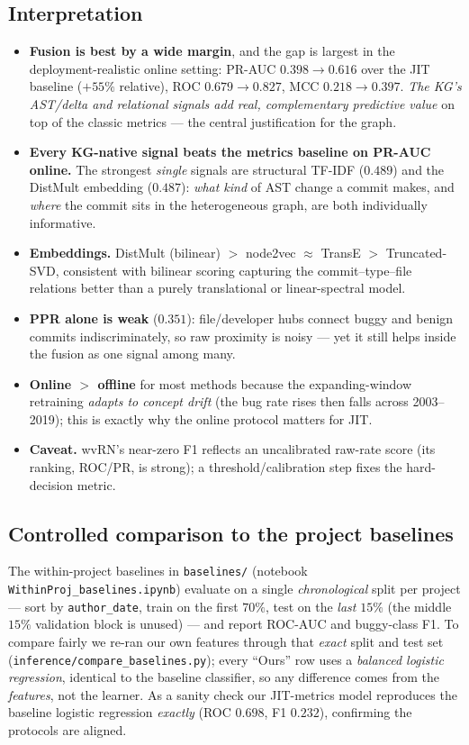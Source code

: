 \documentclass[11pt,a4paper]{article}
\newcommand{\code}[1]{\texttt{#1}}
\begin{document}
	\subsection{Interpretation}
	\begin{itemize}[nosep]
		\item \textbf{Fusion is best by a wide margin}, and the gap is largest in the
		deployment-realistic online setting: PR-AUC $0.398\!\rightarrow\!0.616$
		over the JIT baseline ($+55\%$ relative), ROC $0.679\!\rightarrow\!0.827$,
		MCC $0.218\!\rightarrow\!0.397$. \emph{The KG's AST/delta and relational
			signals add real, complementary predictive value} on top of the classic
		metrics --- the central justification for the graph.
		\item \textbf{Every KG-native signal beats the metrics baseline on PR-AUC
			online.} The strongest \emph{single} signals are structural TF-IDF
		($0.489$) and the DistMult embedding ($0.487$): \emph{what kind} of AST
		change a commit makes, and \emph{where} the commit sits in the
		heterogeneous graph, are both individually informative.
		\item \textbf{Embeddings.} DistMult (bilinear) $>$ node2vec $\approx$ TransE
		$>$ Truncated-SVD, consistent with bilinear scoring capturing the
		commit--type--file relations better than a purely translational or
		linear-spectral model.
		\item \textbf{PPR alone is weak} ($0.351$): file/developer hubs connect buggy
		and benign commits indiscriminately, so raw proximity is noisy --- yet it
		still helps inside the fusion as one signal among many.
		\item \textbf{Online $>$ offline} for most methods because the
		expanding-window retraining \emph{adapts to concept drift} (the bug rate
		rises then falls across 2003--2019); this is exactly why the online
		protocol matters for JIT.
		\item \textbf{Caveat.} wvRN's near-zero F1 reflects an uncalibrated raw-rate
		score (its ranking, ROC/PR, is strong); a threshold/calibration step
		fixes the hard-decision metric.
	\end{itemize}
	
	\subsection{Controlled comparison to the project baselines}\label{sec:cmp}
	The within-project baselines in \texttt{baselines/} (notebook
	\texttt{WithinProj\_baselines.ipynb}) evaluate on a single \emph{chronological}
	split per project --- sort by \code{author\_date}, train on the first $70\%$,
	test on the \emph{last} $15\%$ (the middle $15\%$ validation block is unused) ---
	and report ROC-AUC and buggy-class F1. To compare fairly we re-ran our own
	features through that \emph{exact} split and test set
	(\texttt{inference/compare\_baselines.py}); every ``Ours'' row uses a
	\emph{balanced logistic regression}, identical to the baseline classifier, so any
	difference comes from the \emph{features}, not the learner. As a sanity check our
	JIT-metrics model reproduces the baseline logistic regression \emph{exactly}
	(ROC $0.698$, F1 $0.232$), confirming the protocols are aligned.
	
\end{document}

